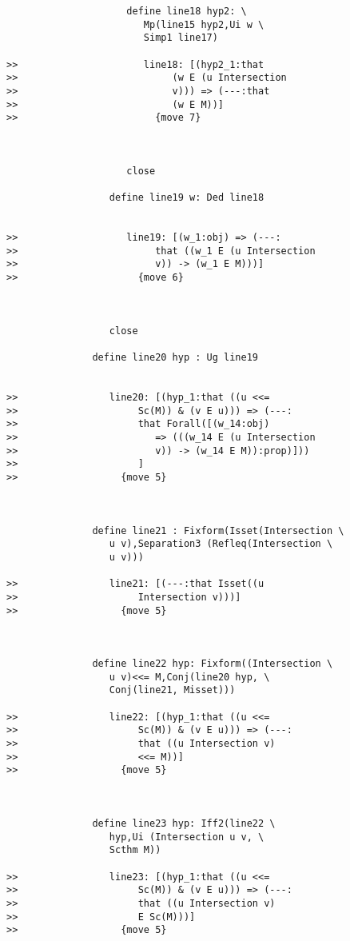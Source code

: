 \documentclass[12pt]{article}
\begin{document}
\begin{verbatim}
                     define line18 hyp2: \
                        Mp(line15 hyp2,Ui w \
                        Simp1 line17)

>>                      line18: [(hyp2_1:that
>>                           (w E (u Intersection
>>                           v))) => (---:that
>>                           (w E M))]
>>                        {move 7}



                     close

                  define line19 w: Ded line18


>>                   line19: [(w_1:obj) => (---:
>>                        that ((w_1 E (u Intersection
>>                        v)) -> (w_1 E M)))]
>>                     {move 6}



                  close

               define line20 hyp : Ug line19


>>                line20: [(hyp_1:that ((u <<=
>>                     Sc(M)) & (v E u))) => (---:
>>                     that Forall([(w_14:obj)
>>                        => (((w_14 E (u Intersection
>>                        v)) -> (w_14 E M)):prop)]))
>>                     ]
>>                  {move 5}



               define line21 : Fixform(Isset(Intersection \
                  u v),Separation3 (Refleq(Intersection \
                  u v)))

>>                line21: [(---:that Isset((u
>>                     Intersection v)))]
>>                  {move 5}



               define line22 hyp: Fixform((Intersection \
                  u v)<<= M,Conj(line20 hyp, \
                  Conj(line21, Misset)))

>>                line22: [(hyp_1:that ((u <<=
>>                     Sc(M)) & (v E u))) => (---:
>>                     that ((u Intersection v)
>>                     <<= M))]
>>                  {move 5}



               define line23 hyp: Iff2(line22 \
                  hyp,Ui (Intersection u v, \
                  Scthm M))

>>                line23: [(hyp_1:that ((u <<=
>>                     Sc(M)) & (v E u))) => (---:
>>                     that ((u Intersection v)
>>                     E Sc(M)))]
>>                  {move 5}




\end{verbatim}
\end{document}
